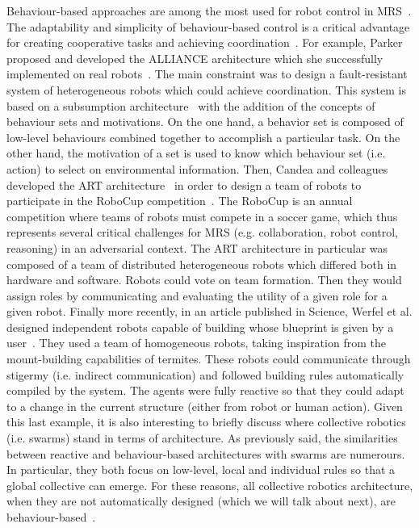     Behaviour-based approaches are among the most used for robot control in MRS~\parencite{Arkin1998, Mataric2008, Parker2008}. The adaptability and simplicity of behaviour-based control is a critical advantage for creating cooperative tasks and achieving coordination~\parencite{Mataric1995, Iocchi2001}. For example, Parker proposed and developed the ALLIANCE architecture which she successfully implemented on real robots~\parencite{Parker1994}. The main constraint was to design a fault-resistant system of heterogeneous robots which could achieve coordination. This system is based on a subsumption architecture~\parencite{Brooks1986} with the addition of the concepts of behaviour sets and motivations. On the one hand, a behavior set is composed of low-level behaviours combined together to accomplish a particular task. On the other hand, the motivation of a set is used to know which behaviour set (i.e. action) to select on environmental information. Then, Candea and colleagues developed the ART architecture~\parencite{Candea2001} in order to design a team of robots to participate in the RoboCup competition~\parencite{Kitano1997}. The RoboCup is an annual competition where teams of robots must compete in a soccer game, which thus represents several critical challenges for MRS (e.g. collaboration, robot control, reasoning) in an adversarial context. The ART architecture in particular was composed of a team of distributed heterogeneous robots which differed both in hardware and software. Robots could vote on team formation. Then they would assign roles by communicating and evaluating the utility of a given role for a given robot. Finally more recently, in an article published in Science, Werfel et al. designed independent robots capable of building whose blueprint is given by a user~\parencite{Werfel2014}. They used a team of homogeneous robots, taking inspiration from the mount-building capabilities of termites. These robots could communicate through stigermy (i.e. indirect communication) and followed building rules automatically compiled by the system. The agents were fully reactive so that they could adapt to a change in the current structure (either from robot or human action). Given this last example, it is also interesting to briefly discuss where collective robotics (i.e. swarms) stand in terms of architecture. As previously said, the similarities between reactive and behaviour-based architectures with swarms are numerours. In particular, they both focus on low-level, local and individual rules so that a global collective can emerge. For these reasons, all collective robotics architecture, when they are not automatically designed (which we will talk about next), are behaviour-based~\parencite{Brambilla2012, Zoghby2013}.


